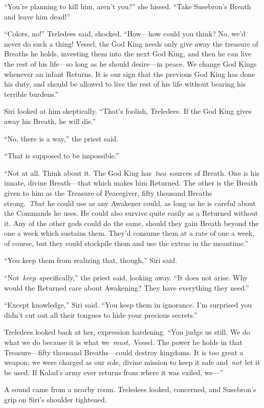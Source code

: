 “You’re planning to kill him, aren’t you?” she hissed. “Take Susebron’s Breath and leave him dead!”

“Colors, no!” Treledees said, shocked. “How—how could you think? No, we’d never do such a thing! Vessel, the God King needs only give away the treasure of Breaths he holds, investing them into the next God King, and then he can live the rest of his life—so long as he should desire—in peace. We change God Kings whenever an infant Returns. It is our sign that the previous God King has done his duty, and should be allowed to live the rest of his life without bearing his terrible burdens.”

Siri looked at him skeptically. “That’s foolish, Treledees. If the God King gives away his Breath, he will die.”

“No, there is a way,” the priest said.

“That is supposed to be impossible.”

“Not at all. Think about it. The God King has~\textit{two}~sources of Breath. One is his innate, divine Breath—that which makes him Returned. The other is the Breath given to him as the Treasure of Peacegiver, fifty thousand Breaths strong.~\textit{That}~he could use as any Awakener could, as long as he is careful about the Commands he uses. He could also survive quite easily as a Returned without it. Any of the other gods could do the same, should they gain Breath beyond the one a week which sustains them. They’d consume them at a rate of one a week, of course, but they could stockpile them and use the extras in the meantime.”

“You keep them from realizing that, though,” Siri said.

“Not~\textit{keep}~specifically,” the priest said, looking away. “It does not arise. Why would the Returned care about Awakening? They have everything they need.”

“Except knowledge,” Siri said. “You keep them in ignorance. I’m surprised you didn’t cut out all their tongues to hide your precious secrets.”

Treledees looked back at her, expression hardening. “You judge us still. We do what we do because it is what we~\textit{must,}~Vessel. The power he holds in that Treasure—fifty thousand Breaths—could destroy kingdoms. It is too great a weapon; we were charged as our sole, divine mission to keep it safe and~\textit{not}~let it be used. If Kalad’s army ever returns from where it was exiled, we—”

A sound came from a nearby room. Treledees looked, concerned, and Susebron’s grip on Siri’s shoulder tightened.

